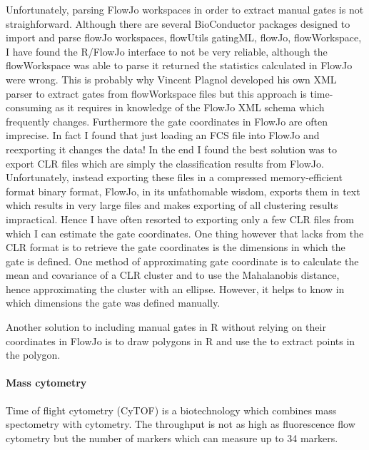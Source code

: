 Unfortunately, parsing FlowJo workspaces in order to extract manual gates is not straighforward.
Although there are several BioConductor packages designed to import and parse flowJo workspaces, flowUtils gatingML, flowJo, flowWorkspace,
I have found the R/FlowJo interface to not be very reliable, although the flowWorkspace was able to parse it returned the statistics calculated in FlowJo were wrong.
This is probably why Vincent Plagnol developed his own XML parser to extract gates from flowWorkspace files but this approach is time-consuming as it requires in knowledge of the FlowJo XML schema which frequently changes.
Furthermore the gate coordinates in FlowJo are often imprecise.
In fact I found that just loading an FCS file into FlowJo and reexporting it changes the data!
In the end I found the best solution was to export CLR files which are simply the classification results from FlowJo.
Unfortunately, instead exporting these files in a compressed memory-efficient format binary format, FlowJo, in its unfathomable wisdom, exports them in text which results in very large files and makes exporting of all clustering results impractical.
Hence I have often resorted to exporting only a few CLR files from which I can estimate the gate coordinates.
One thing however that lacks from the CLR format is to retrieve the gate coordinates is the dimensions in which the gate is defined.
One method of approximating gate coordinate is to calculate the mean and covariance of a CLR cluster and to use the Mahalanobis distance,
hence approximating the cluster with an ellipse.
However, it helps to know in which dimensions the gate was defined manually.

Another solution to including manual gates in R without relying on their coordinates in FlowJo
is to draw polygons in R and use the  to extract points in the polygon.

\paragraph{Mass cytometry}

Time of flight cytometry (CyTOF) is a biotechnology which combines mass spectometry with cytometry.
The throughput is not as high as fluorescence flow cytometry but the number of markers which can measure up to 34 markers.

